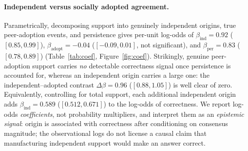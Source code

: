 \paragraph{Independent versus socially adopted agreement.}
\label{par:independent_inherited_results}
Parametrically, decomposing support into genuinely independent origins, true peer-adoption events, and
persistence gives per-unit log-odds of $\beta_{\mathrm{ind}}=0.92$ ($[0.85,0.99]$),
$\beta_{\mathrm{adopt}}=-0.04$ ($[-0.09,0.01]$, not significant), and $\beta_{\mathrm{per}}=0.83$
($[0.78,0.89]$) (Table~\ref{tab:coef}, Figure~\ref{fig:coef}). Strikingly, genuine peer-adoption support
carries \emph{no} detectable correctness signal once persistence is accounted for, whereas an independent
origin carries a large one: the independent--adopted contrast $\Delta\beta=0.96$ ($[0.88,1.05]$) is well
clear of zero. Equivalently,
controlling for total support, each additional independent origin adds $\beta_{\mathrm{ind}}=0.589$
($[0.512,0.671]$) to the log-odds of correctness. We report log-odds \emph{coefficients}, not probability
multipliers, and interpret them as an \emph{epistemic signal}: origin is associated with correctness after
conditioning on consensus magnitude; the observational logs do not license a causal claim that manufacturing
independent support would make an answer correct.


